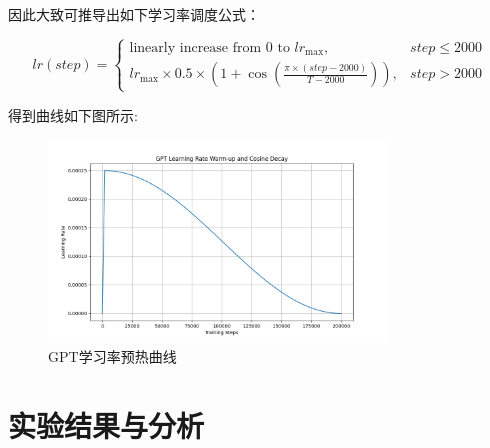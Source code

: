 \documentclass[a4paper,12pt]{article}
\begin{document}
因此大致可推导出如下学习率调度公式：

$$
lr(step) = 
\begin{cases}
\text{linearly increase from 0 to } lr_{\text{max}}, & step \leq 2000 \\
lr_{\text{max}} \times 0.5 \times (1 + \cos(\frac{\pi \times (step - 2000)}{T - 2000})), & step > 2000
\end{cases}
$$

得到曲线如下图所示:

\begin{figure}[H]
    \centering
    \includegraphics[width=0.8\textwidth]{image/Figure_1.png}
    \caption{GPT学习率预热曲线}
\end{figure}

\section{实验结果与分析}
\end{document}
